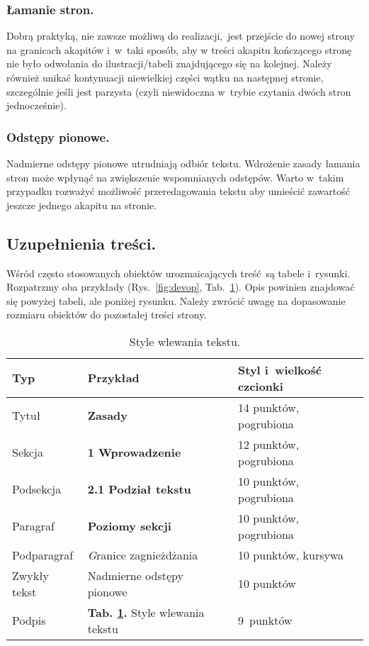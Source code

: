 \subsubsection{Łamanie stron.}
\label{subsubsec:pagebreak}

Dobrą praktyką, nie zawsze możliwą do realizacji, jest przejście do nowej strony na granicach akapitów i~w~taki sposób, aby w treści akapitu kończącego stronę nie było odwołania do ilustracji/tabeli znajdującego się na kolejnej. Należy również unikać kontynuacji niewielkiej części wątku na następnej stronie, szczególnie jeśli jest parzysta (czyli niewidoczna w~trybie czytania dwóch stron jednocześnie).

\subsubsection{Odstępy pionowe.}
\label{subsubsec:verticalSpace}

Nadmierne odstępy pionowe utrudniają odbiór tekstu. Wdrożenie zasady łamania stron może wpłynąć na zwiększenie wspomnianych odstępów. Warto w~takim przypadku rozważyć możliwość przeredagowania tekstu aby umieścić zawartość jeszcze jednego akapitu na stronie.

\subsection{Uzupełnienia treści.}
\label{subsec:additions}

Wśród często stosowanych obiektów urozmaicających treść są tabele i~rysunki. Rozpatrzmy oba przykłady (Rys.~\ref{fig:devop}, Tab.~\ref{tab:styles}). Opis powinien znajdować się powyżej tabeli, ale poniżej rysunku. Należy zwrócić uwagę na dopasowanie rozmiaru obiektów do pozostałej treści strony.

\begin{table}[!h]
	\vspace{-4mm}
	\caption{
		Style wlewania tekstu.
	}
	\begin{center}
		\begin{tabular}{lll}
			\hline
			Typ & Przykład & Styl i~wielkość czcionki\\
			\hline
			Tytuł & {\Large\bfseries Zasady} & 14 punktów, pogrubiona\\
			Sekcja &  {\large\bfseries 1 Wprowadzenie} & 12 punktów, pogrubiona\\
			Podsekcja & {\bfseries 2.1 Podział tekstu} & 10 punktów, pogrubiona\\
			Paragraf & {\bfseries Poziomy sekcji} & 10 punktów, pogrubiona\\
			Podparagraf & {\textit Granice zagnieżdżania} & 10 punktów, kursywa\\
			Zwykły tekst & Nadmierne odstępy pionowe & 10 punktów\\
			Podpis & {\small\textbf{Tab. \ref{tab:styles}.} Style wlewania tekstu} & 9~punktów\\
			\hline
		\end{tabular}
	\end{center}
	\label{tab:styles}
	\vspace{-6mm}
\end{table}

